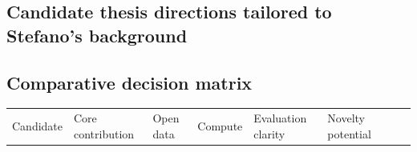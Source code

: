 \documentclass[
  a4paper,
  11pt]{article}
\begin{document}
\begin{landscape}
\hypertarget{candidate-thesis-directions-tailored-to-stefanos-background}{%
\section{Candidate thesis directions tailored to Stefano's
background}\label{candidate-thesis-directions-tailored-to-stefanos-background}}

\hypertarget{comparative-decision-matrix}{%
\subsection{Comparative decision
matrix}\label{comparative-decision-matrix}}

\begin{footnotesize}
\setlength{\tabcolsep}{3pt}
\begin{longtable}[]{@{}
  >{\raggedright\arraybackslash}p{}
  >{\raggedright\arraybackslash}p{}
  >{\centering\arraybackslash}p{}
  >{\centering\arraybackslash}p{}
  >{\centering\arraybackslash}p{}
  >{\centering\arraybackslash}p{}
  >{\raggedright\arraybackslash}p{}
  >{\centering\arraybackslash}p{}@{}}
\toprule\noalign{}
\begin{minipage}[b]{\linewidth}\raggedright
Candidate
\end{minipage} & \begin{minipage}[b]{\linewidth}\raggedright
Core contribution
\end{minipage} & \begin{minipage}[b]{\linewidth}\raggedleft
Open data
\end{minipage} & \begin{minipage}[b]{\linewidth}\raggedleft
Compute
\end{minipage} & \begin{minipage}[b]{\linewidth}\raggedleft
Evaluation clarity
\end{minipage} & \begin{minipage}[b]{\linewidth}\raggedleft
Novelty potential
\end{minipage} & \begin{minipage}[b]{\linewidth}\raggedright

\end{minipage}
\end{longtable}
\end{footnotesize}
\end{landscape}
\end{document}
